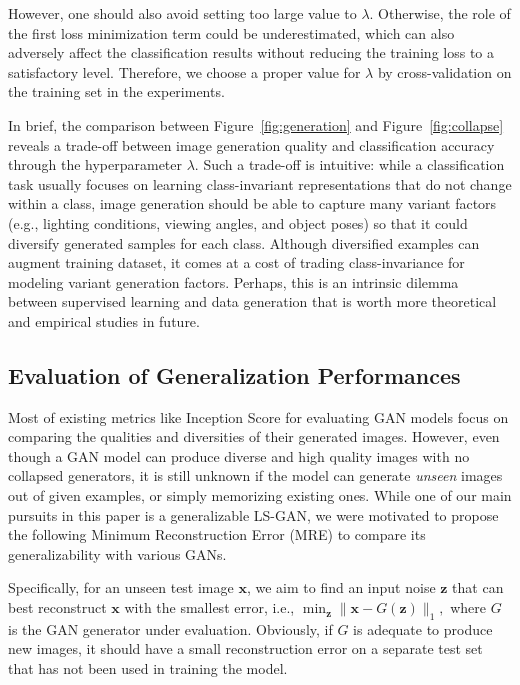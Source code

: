 \documentclass[11pt,fullpage, letterpaper,twoside]{article}
\newcommand{\1}[1]{\mathds{1}_{\left[#1\right]}}
\begin{document}
However, one should also avoid setting too large value to $\lambda$.  Otherwise, the role of the first loss minimization term could be underestimated, which can also adversely affect the classification results without reducing the training loss to a satisfactory level.  Therefore, we choose a proper value for $\lambda$ by cross-validation on the training set in the experiments.


In brief, the comparison between Figure~\ref{fig:generation} and Figure~\ref{fig:collapse} reveals a trade-off between image generation quality and classification accuracy through the hyperparameter $\lambda$. Such a trade-off is intuitive: while a classification task usually focuses on learning class-invariant representations that do not change within a class, image generation should be able to capture many variant factors (e.g., lighting conditions, viewing angles, and object poses) so that it could diversify generated samples for each class. Although diversified examples can augment training dataset, it comes at a cost of trading class-invariance for modeling variant generation factors. Perhaps, this is an intrinsic dilemma between supervised learning and data generation that is worth more theoretical and empirical studies in future.

\subsection{Evaluation of Generalization Performances}\label{sec:eval_gen}






Most of existing metrics like Inception Score \cite{salimans2016improved} for evaluating GAN models focus on comparing the qualities and diversities of their generated images. However, even though a GAN model can produce diverse and high quality images with no collapsed generators, it is still unknown if the model can generate {\em unseen} images out of given examples, or simply memorizing existing ones.  While one of our main pursuits in this paper is a generalizable LS-GAN, we were motivated to propose the following Minimum Reconstruction Error (MRE) to compare its generalizability with various GANs.







Specifically, for an unseen test image $\mathbf x$, we aim to find an input noise $\mathbf z$ that can best reconstruct $\mathbf x$ with the smallest error, i.e.,
$
\min_\mathbf z \|\mathbf x-G(\mathbf z) \|_1,
$
where $G$ is the GAN generator under evaluation. Obviously, if $G$ is adequate to produce new images, it should have a small reconstruction error on a separate test set that has not been used in training the model.
\end{document}
